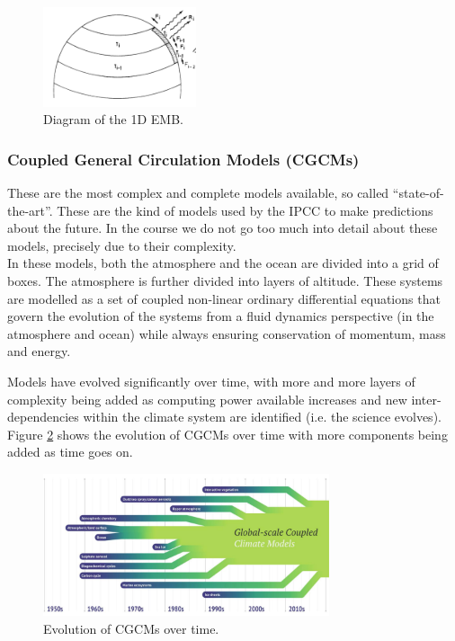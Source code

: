 \begin{figure}[h]
    \centering
    \includegraphics[width=0.4\textwidth]{figures/1demb diagram.png}
    \caption{Diagram of the 1D EMB.}
    \label{fig:1D-EBM-diagram}
\end{figure}

\subsubsection{Coupled General Circulation Models (CGCMs)}
\label{sec:CGCMs}

These are the most complex and complete models available, so called ``state-of-the-art''.
These are the kind of models used by the IPCC to make predictions about the future.
In the course we do not go too much into detail about these models, precisely due
to their complexity.\\

In these models, both the atmosphere and the ocean are divided into a grid of
boxes. The atmosphere is further divided into layers of altitude. These systems
are modelled as a set of coupled non-linear ordinary differential equations that
govern the evolution of the systems from a fluid dynamics perspective (in the 
atmosphere and ocean) while always ensuring conservation of momentum, mass and
energy.

Models have evolved significantly over time, with more and more layers of complexity
being added as computing power available increases and new inter-dependencies 
within the climate system are identified (i.e. the science evolves). Figure
\ref{fig:evolution-cgcm} shows the evolution of CGCMs over time with more components
being added as time goes on.

\begin{figure}[h]
    \centering
    \includegraphics[width=0.75\textwidth]{figures/evolution cgcm.png}
    \caption{Evolution of CGCMs over time.}
    \label{fig:evolution-cgcm}
\end{figure}

